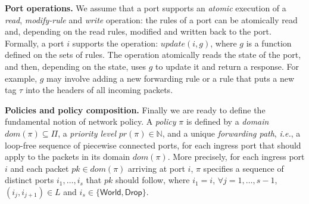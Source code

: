 \documentclass[11pt,pdftex,letter]{article}
\newcommand{\dom}{\textit{dom}}
\newcommand{\pr}{\textit{pr}}
\newcommand{\ie}{{\it i.e.}}
\newcommand{\pknote}[1]{\textcolor{heraldBlue}{\small \bf [PK: #1]}}
\newcommand{\pknote}[1]{}
\newcommand{\ignore}[1]{}
\begin{document}

\vspace{1mm}\noindent\textbf{Port operations.}
%
We assume that a port supports an \emph{atomic} execution of a \textit{read}, \textit{modify-rule}
and \textit{write} operation: the rules of a port can be atomically read and, depending
on the read rules, modified and written back to the port.
Formally, a port $i$ supports the operation:
$\textit{update}(i,g)$, where $g$ is a function defined on the
sets of rules.
The operation atomically reads the state of the port, and then, depending
on the state, uses $g$ to update it and return a response.
For example, $g$ may involve adding a new forwarding rule or
a rule that puts a new tag $\tau$ into the headers
of all incoming packets.

\ignore{
In Section~\ref{sec:discussion}, we give a valency proof that
under a weaker port model of atomic reads and writes,
the CPC Problem is impossible to solve.
}



\vspace{1mm}\noindent\textbf{Policies and policy composition.}
Finally we are ready to define the fundamental notion of network policy.
A \emph{policy} $\pi$ is defined by a \emph{domain} $\dom(\pi)\subseteq
\Pi$, a \emph{priority level} $\pr(\pi) \in\mathbb{N}$, and a unique
\emph{forwarding path}, \ie, a loop-free sequence of piecewise connected ports,
for each ingress port that should apply to the packets in its domain
$\textit{dom}(\pi)$. More precisely, for each ingress port $i$ and each packet
$pk\in\dom(\pi)$ arriving at port $i$, $\pi$ specifies a sequence of distinct
ports $i_1,\ldots,i_s$ that $pk$ should follow, where $i_1=i$, $\forall
j=1,\ldots,s-1$, $(i_j,i_{j+1})\in L$ and
$i_s\in\{\textsf{World},\textsf{Drop}\}$.
\end{document}
